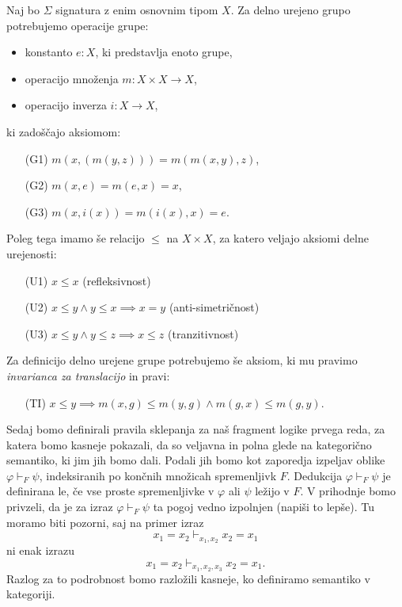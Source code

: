 \documentclass[../kategoricna_logika.tex]{subfiles}
\begin{document}
\begin{primer}\label{primer:delno-urejene-grupe}
  Naj bo $\Sigma$ signatura z enim osnovnim tipom $X$. Za delno
  urejeno grupo potrebujemo operacije grupe:
  \begin{itemize}
  \item konstanto $e : X$, ki predstavlja enoto grupe,
  \item operacijo množenja $m : X \times X \to X$,
  \item operacijo inverza $i : X \to X$,
  \end{itemize}
  ki zadoščajo aksiomom:
  \begin{itemize}
  \item[(G1)] $m(x,(m(y,z))) = m(m(x,y), z)$,
  \item[(G2)] $m(x,e) = m(e,x) = x$,
  \item[(G3)] $m(x,i(x)) = m(i(x), x) = e$.
  \end{itemize}
  Poleg tega imamo še relacijo $\leq$ na $X \times X$, za katero
  veljajo aksiomi delne urejenosti:
  \begin{itemize}
  \item[(U1)] $x \leq x$ (refleksivnost)
  \item[(U2)] $x \leq y \wedge y \leq x \implies x = y$
    (anti-simetričnost)
  \item[(U3)] $x \leq y \wedge y \leq z \implies x \leq z$
    (tranzitivnost)
  \end{itemize}
  Za definicijo delno urejene grupe potrebujemo še aksiom, ki mu
  pravimo {\emph{invarianca za translacijo}} in pravi:
  \begin{itemize}
  \item[(TI)]
    $x \leq y \implies m(x, g) \leq m(y, g) \wedge m(g,x) \leq
    m(g,y)$.
  \end{itemize}
\end{primer}

Sedaj bomo definirali pravila sklepanja za naš fragment logike prvega
reda, za katera bomo kasneje pokazali, da so veljavna in polna glede
na kategorično semantiko, ki jim jih bomo dali.  Podali jih bomo kot
zaporedja izpeljav oblike $\varphi \vdash_F \psi$, indeksiranih po
končnih množicah spremenljivk $F$. Dedukcija $\varphi \vdash_F \psi$
je definirana le, če vse proste spremenljivke v $\varphi$ ali $\psi$
ležijo v $F$. V prihodnje bomo privzeli, da je za izraz
$\varphi \vdash_F \psi$ ta pogoj vedno izpolnjen (napiši to lepše).
Tu moramo biti pozorni, saj na primer izraz
\[x_1 = x_2 \vdash_{x_1, x_2} x_2 = x_1\] ni enak izrazu
\[x_1 = x_2 \vdash_{x_1, x_2, x_3} x_2 = x_1.\] Razlog za to
podrobnost bomo razložili kasneje, ko definiramo semantiko v
kategoriji.
\end{document}
